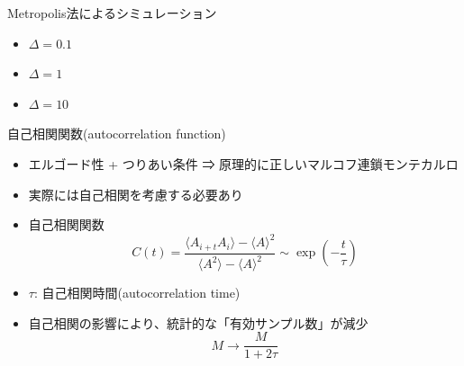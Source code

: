 \begin{frame}[t,fragile]{Metropolis法によるシミュレーション}
  \begin{itemize}
    \setlength{\itemsep}{1em}
  \item $\Delta = 0.1$
    
    \vspace*{-2em}\hfill {}
  \item $\Delta = 1$
    
    \vspace*{-2em}\hfill {}
  \item $\Delta = 10$
    
    \vspace*{-2em}\hfill {}
  \end{itemize}
\end{frame}

\begin{frame}[t,fragile]{自己相関関数(autocorrelation function)}
  \begin{itemize}
    \setlength{\itemsep}{1em}
  \item エルゴード性 + つりあい条件 ⇒ 原理的に正しいマルコフ連鎖モンテカルロ
  \item 実際には自己相関を考慮する必要あり
  \item 自己相関関数
    \[
    C(t) = \frac{\langle A_{i+t}A_i \rangle - \langle A \rangle^2}{\langle A^2 \rangle - \langle A \rangle^2} \sim \exp(-\frac{t}{\tau})
    \]
  \item $\tau$: 自己相関時間(autocorrelation time)
  \item 自己相関の影響により、統計的な「有効サンプル数」が減少
    \[
    M \rightarrow \frac{M}{1+2\tau}
    \]
  \end{itemize}
\end{frame}

